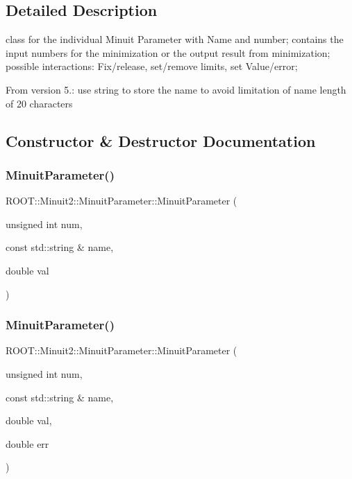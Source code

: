 \subsection{Detailed Description}
class for the individual Minuit Parameter with Name and number; contains the input numbers for the minimization or the output result from minimization; possible interactions\+: Fix/release, set/remove limits, set Value/error;

From version 5.\+: use string to store the name to avoid limitation of name length of 20 characters 

\subsection{Constructor \& Destructor Documentation}
\mbox{\label{classROOT_1_1Minuit2_1_1MinuitParameter_afa9a57b4990491316502a21e09b756bc}} 
\subsubsection{\texorpdfstring{MinuitParameter()}{MinuitParameter()}\hspace{0.1cm}{\footnotesize\ttfamily [1/12]}}
{\footnotesize\ttfamily R\+O\+O\+T\+::\+Minuit2\+::\+Minuit\+Parameter\+::\+Minuit\+Parameter (\begin{DoxyParamCaption}\item[{unsigned int}]{num,  }\item[{const std\+::string \&}]{name,  }\item[{double}]{val }\end{DoxyParamCaption})\hspace{0.3cm}{\ttfamily [inline]}}

\mbox{\label{classROOT_1_1Minuit2_1_1MinuitParameter_a56d290ba2abc3c599cff99187329a91a}} 
\subsubsection{\texorpdfstring{MinuitParameter()}{MinuitParameter()}\hspace{0.1cm}{\footnotesize\ttfamily [2/12]}}
{\footnotesize\ttfamily R\+O\+O\+T\+::\+Minuit2\+::\+Minuit\+Parameter\+::\+Minuit\+Parameter (\begin{DoxyParamCaption}\item[{unsigned int}]{num,  }\item[{const std\+::string \&}]{name,  }\item[{double}]{val,  }\item[{double}]{err }\end{DoxyParamCaption})\hspace{0.3cm}{\ttfamily [inline]}}

